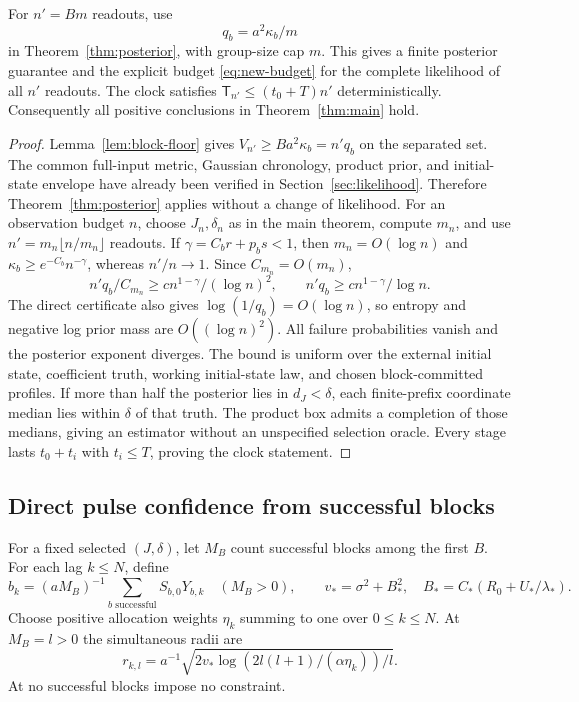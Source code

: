 \begin{theorem}
\label{thm:block-posterior}
For $n'=Bm$ readouts, use
\begin{equation}
 q_b=a^2\kappa_b/m
 \label{eq:block-q}
\end{equation}
in Theorem~\ref{thm:posterior}, with group-size cap $m$. This gives a finite
posterior guarantee and the explicit budget \eqref{eq:new-budget} for the
complete likelihood of all $n'$ readouts. The clock satisfies
$\mathsf T_{n'}\le(t_0+T)n'$ deterministically.
Consequently all positive conclusions in Theorem~\ref{thm:main} hold.
\end{theorem}
\begin{proof}
Lemma~\ref{lem:block-floor} gives $V_{n'}\ge Ba^2\kappa_b=n'q_b$ on the
separated set. The common full-input metric, Gaussian chronology, product prior,
and initial-state envelope have already been verified in
Section~\ref{sec:likelihood}. Therefore Theorem~\ref{thm:posterior} applies
without a change of likelihood.
For an observation budget $n$, choose $J_n,\delta_n$ as in the main theorem,
compute $m_n$, and use $n'=m_n\lfloor n/m_n\rfloor$ readouts. If
$\gamma=C_b r+p_b s<1$, then $m_n=O(\log n)$ and
$\kappa_b\ge e^{-C_b}n^{-\gamma}$, whereas $n'/n\to1$.
Since $C_{m_n}=O(m_n)$,
\[
 n'q_b/C_{m_n}\ge c n^{1-\gamma}/(\log n)^2,
 \qquad n'q_b\ge c n^{1-\gamma}/\log n.
\]
The direct certificate also gives $\log(1/q_b)=O(\log n)$, so entropy and
negative log prior mass are $O((\log n)^2)$. All failure probabilities vanish
and the posterior exponent diverges. The bound is uniform over the external
initial state, coefficient truth, working initial-state law, and chosen
block-committed profiles. If more than half the posterior lies in
$d_J<\delta$, each finite-prefix coordinate median lies within $\delta$ of
that truth. The product box admits a completion of those medians, giving an
estimator without an unspecified selection oracle. Every stage lasts $t_0+t_i$
with $t_i\le T$, proving the clock statement.
\end{proof}

\subsection{Direct pulse confidence from successful blocks}
For a fixed selected $(J,\delta)$, let $M_B$ count successful blocks among the
first $B$. For each lag $k\le N$, define
\[
 \widehat b_k=(aM_B)^{-1}\sum_{b\text{ successful}}S_{b,0}Y_{b,k}
 \quad(M_B>0),\qquad
 v_* =\sigma^2+B_*^2,\quad B_*=C_*(R_0+U_*/\lambda_*).
\]
Choose positive allocation weights $\eta_k$ summing to one over $0\le k\le N$.
At $M_B=l>0$ the simultaneous radii are
\begin{equation}
 r_{k,l}=a^{-1}\sqrt{2v_*\log(2l(l+1)/(\alpha\eta_k))/l}.
 \label{eq:pulse-bands}
\end{equation}
At no successful blocks impose no constraint.

